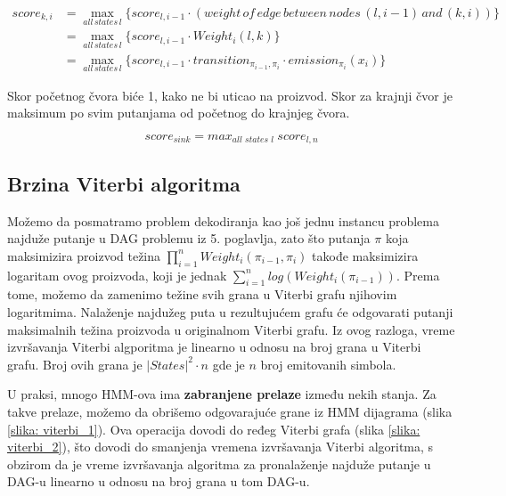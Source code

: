 \begin{equation}
\begin{aligned}
    score_{k, i} &= {\displaystyle \max_{all\,states\,l} \{score_{l, i-1} \cdot (weight\,of\,edge\,between\,nodes\,(l, i-1)\,and\,(k, i))\}} \\
    & = \max_{all\,states\,l} \{score_{l, i-1} \cdot Weight_i(l, k)\}\\
    & = \max_{all\,states\,l} \{score_{l, i-1} \cdot transition_{\pi_{i-1},\pi_i} \cdot emission_{\pi_i}(x_i)\}
\end{aligned}
\end{equation}


Skor početnog čvora biće 1, kako ne bi uticao na proizvod. Skor za krajnji čvor je maksimum  po svim putanjama od početnog do krajnjeg čvora.

$$score_{sink} = max_{\textit{all states l  }} score_{l, n}$$

\subsection{Brzina Viterbi algoritma}

Možemo da posmatramo problem dekodiranja kao još jednu instancu problema najduže putanje u DAG problemu iz 5. poglavlja, zato što putanja $ \pi $ koja maksimizira proizvod težina $ {\displaystyle \prod_{i=1}^{n}  Weight_i(\pi_{i-1}, \pi_i)} $ takođe maksimizira logaritam ovog proizvoda,  koji je jednak $ {\displaystyle \sum_{i=1}^{n}  log(Weight_i(\pi_{i-1}))} $. Prema tome, možemo da zamenimo težine svih grana u Viterbi grafu njihovim logaritmima. Nalaženje najdužeg puta u rezultujućem grafu će odgovarati putanji maksimalnih težina proizvoda u originalnom Viterbi grafu. Iz ovog razloga, vreme izvršavanja Viterbi algporitma je linearno u odnosu na broj grana u Viterbi grafu. Broj ovih grana je $ |States|^2 \cdot n $ gde je $ n $ broj emitovanih simbola.

U praksi, mnogo HMM-ova ima \textbf{zabranjene prelaze} između nekih stanja. Za takve prelaze, možemo da obrišemo odgovarajuće grane iz HMM dijagrama (slika \ref{slika: viterbi_1}). Ova operacija dovodi do ređeg Viterbi grafa (slika \ref{slika: viterbi_2}), što dovodi do smanjenja vremena izvršavanja Viterbi algoritma, s obzirom da je vreme izvršavanja algoritma za pronalaženje najduže putanje u DAG-u linearno u odnosu na broj grana u tom DAG-u.


